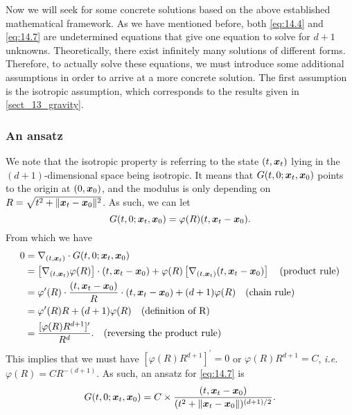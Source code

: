 Now we will seek for some concrete solutions based on the above established mathematical framework. As we have mentioned before, both \cref{eq:14.4} and \cref{eq:14.7} are undetermined equations that give one equation to solve for $d+1$ unknowns. Theoretically, there exist infinitely many solutions of different forms. Therefore, to actually solve these equations, we must introduce some additional assumptions in order to arrive at a more concrete solution. The first assumption is the isotropic assumption, which corresponds to the results given in \cref{sect_13_gravity}.

\subsubsection{An ansatz}

We note that the isotropic property is referring to the state $(t,\bm{x}_{t})$ lying in the $(d+1)$-dimensional space being isotropic. It means that $G(t,0;\bm{x}_{t},\bm{x}_0)$  points to the origin at $(0,\bm{x}_0)$, and the modulus is only depending on $R=\sqrt{t^2+\|\bm{x}_{t}-\bm{x}_0\|^2}$. As such, we can let
\begin{equation}
    \label{eq:14.9}
    G(t,0;\bm{x}_{t},\bm{x}_0)=\varphi(R)(t,\bm{x}_{t}-\bm{x}_0).
\end{equation}
From which we have 
\begin{align}
    0 &= \nabla_{(t,\bm{x}_{t})}\cdot G(t,0;\bm{x}_{t},\bm{x}_0) \nonumber \\
      &= \left[\nabla_{(t,\bm{x}_{t})}\varphi(R)\right]\cdot(t,\bm{x}_{t}-\bm{x}_0)+\varphi(R)\left[\nabla_{(t,\bm{x}_{t})}(t,\bm{x}_{t}-\bm{x}_0) \right] \quad \mbox{(product rule)} \nonumber\\
      &= \varphi^{\prime}(R)\cdot\frac{(t,\bm{x}_{t}-\bm{x}_0)}{R}\cdot(t,\bm{x}_{t}-\bm{x}_0)+(d+1)\varphi(R)\quad \mbox{(chain rule)} \nonumber\\
      &=\varphi^{\prime}(R)R+(d+1)\varphi(R) \quad \mbox{(definition of R)} \nonumber\\
      &=\frac{[\varphi(R)R^{d+1}]^{\prime}}{R^d}. \quad \mbox{(reversing the product rule)}\label{eq:14.10}
\end{align}
This implies that we must have $[\varphi(R)R^{d+1}]^{\prime}=0$ or $\varphi(R)R^{d+1}=C$, \emph{i.e.} $\varphi(R)=CR^{-(d+1)}$. As such, an ansatz for \cref{eq:14.7} is
\begin{equation}
    \label{eq:14.11}
    G(t,0;\bm{x}_{t},\bm{x}_0)=C\times\frac{(t,\bm{x}_{t}-\bm{x}_0)}{(t^2+\|\bm{x}_{t}-\bm{x}_0\|)^{(d+1)/2}}.
\end{equation}

